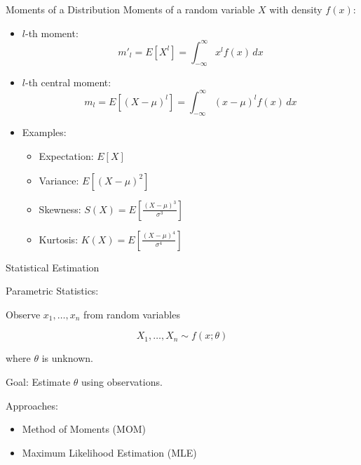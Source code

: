 \documentclass[aspectratio=169]{beamer}
\begin{document}
\begin{frame}{Moments of a Distribution}
Moments of a random variable $X$ with density $f(x)$:

\begin{itemize}
\item $l$-th moment:
\[
m'_l = E[X^l] = \int_{-\infty}^{\infty} x^l f(x)\,dx
\]

\item $l$-th central moment:
\[
m_l = E[(X-\mu)^l] = \int_{-\infty}^{\infty} (x-\mu)^l f(x)\,dx
\]

\item Examples:
\begin{itemize}
\item Expectation: $E[X]$
\item Variance: $E[(X-\mu)^2]$
\item Skewness: $S(X) = E\left[\frac{(X-\mu)^3}{\sigma^3}\right]$
\item Kurtosis: $K(X) = E\left[\frac{(X-\mu)^4}{\sigma^4}\right]$
\end{itemize}

\end{itemize}
\end{frame}

\begin{frame}{Statistical Estimation}

Parametric Statistics:

Observe $x_1, \dots, x_n$ from random variables

\[
X_1, \dots, X_n \sim f(x;\theta)
\]

where $\theta$ is unknown.

\vspace{0.5cm}

Goal: Estimate $\theta$ using observations.

\vspace{0.5cm}

Approaches:

\begin{itemize}
\item Method of Moments (MOM)
\item Maximum Likelihood Estimation (MLE)
\end{itemize}

\end{frame}
\end{document}
